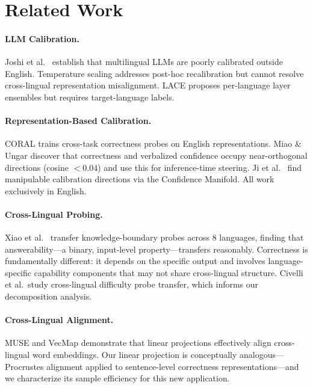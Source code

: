 \documentclass[11pt,a4paper]{article}
\begin{document}
\section{Related Work}

\paragraph{LLM Calibration.}
Joshi et al.\ \citeyearpar{joshi2024llm} establish that multilingual LLMs are poorly calibrated outside English. Temperature scaling \cite{guo2017calibration} addresses post-hoc recalibration but cannot resolve cross-lingual representation misalignment. LACE \cite{zhou2024lace} proposes per-language layer ensembles but requires target-language labels.

\paragraph{Representation-Based Calibration.}
CORAL \cite{miao2026coral} trains cross-task correctness probes on English representations. Miao \& Ungar \citeyearpar{miao2026steering} discover that correctness and verbalized confidence occupy near-orthogonal directions (cosine $<0.04$) and use this for inference-time steering. Ji et al.\ \citeyearpar{ji2024llm} find manipulable calibration directions via the Confidence Manifold. All work exclusively in English.

\paragraph{Cross-Lingual Probing.}
Xiao et al.\ \citeyearpar{xiao2025knowledge} transfer knowledge-boundary probes across 8 languages, finding that answerability---a binary, input-level property---transfers reasonably. Correctness is fundamentally different: it depends on the specific output and involves language-specific capability components that may not share cross-lingual structure. Civelli et al.\ study cross-lingual difficulty probe transfer, which informs our decomposition analysis.

\paragraph{Cross-Lingual Alignment.}
MUSE \cite{conneau2018word} and VecMap \cite{artetxe2018robust} demonstrate that linear projections effectively align cross-lingual word embeddings. Our linear projection is conceptually analogous---Procrustes alignment applied to sentence-level correctness representations---and we characterize its sample efficiency for this new application.
\end{document}
